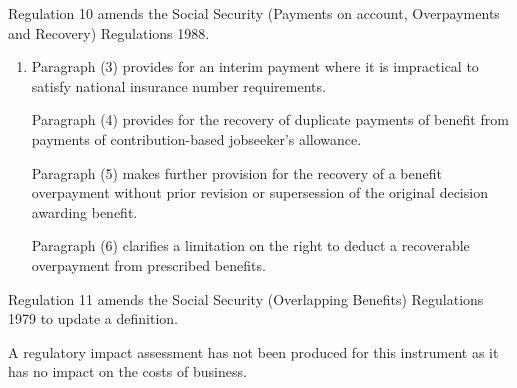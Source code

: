 \documentclass[12pt,a4paper]{article}
\begin{document}
Regulation 10 amends the Social Security (Payments on account, Overpayments and Recovery) Regulations 1988.
\begin{enumerate}\item[]
    Paragraph (3) provides for an interim payment where it is impractical to satisfy national insurance number requirements.

    Paragraph (4) provides for the recovery of duplicate payments of benefit from payments of contribution-based jobseeker’s allowance.

    Paragraph (5) makes further provision for the recovery of a benefit overpayment without prior revision or supersession of the original decision awarding benefit.

    Paragraph (6) clarifies a limitation on the right to deduct a recoverable overpayment from prescribed benefits. 
\end{enumerate}

Regulation 11 amends the Social Security (Overlapping Benefits) Regulations 1979 to update a definition.

A regulatory impact assessment has not been produced for this instrument as it has no impact on the costs of business. 
\end{document}
